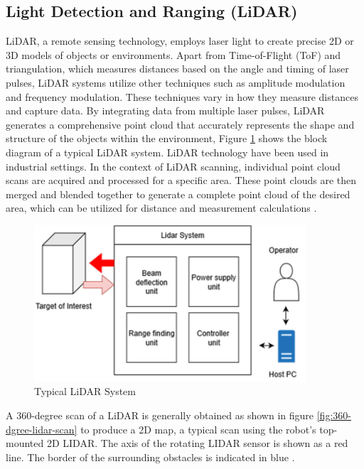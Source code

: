 \subsection{Light Detection and Ranging (LiDAR)}
\label{rrl:subsec:Light Detection and Ranging}
LiDAR, a remote sensing technology, employs laser light to create precise 2D or 3D models of objects or environments. Apart from Time-of-Flight (ToF) and triangulation, which measures distances based on the angle and timing of laser pulses, LiDAR systems utilize other techniques such as amplitude modulation and frequency modulation. These techniques vary in how they measure distances and capture data. By integrating data from multiple laser pulses, LiDAR generates a comprehensive point cloud that accurately represents the shape and structure of the objects within the environment, Figure \ref{fig:Typical LiDAR System} shows the block diagram of a typical LiDAR system. LiDAR technology have been used in industrial settings. In the context of LiDAR scanning, individual point cloud scans are acquired and processed for a specific area. These point clouds are then merged and blended together to generate a complete point cloud of the desired area, which can be utilized for distance and measurement calculations \citep{jaboyedoff2012, raj2020}.

\begin{figure}[H]
	\centering
	\includegraphics[width=0.9\textwidth]{Figures/Block-diagram-of-light-detection-and-ranging-LiDAR-system} %
	\caption{Typical LiDAR System}
	\label{fig:Typical LiDAR System}
\end{figure}

A 360-degree scan of a LiDAR is generally obtained as shown in figure \ref{fig:360-dgree-lidar-scan} to produce a 2D map, a typical scan using the robot's top-mounted 2D LIDAR. The axis of the rotating LIDAR sensor is shown as a red line. The border of the surrounding obstacles is indicated in blue \citep{sarker2020}.

